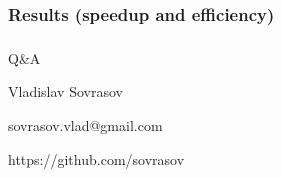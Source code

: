 \documentclass[aspectratio=1610]{beamer}
\begin{document}
\begin{frame}
  \frametitle{Results (speedup and efficiency)}
  \begin{figure}[ht]
      \centering
  \end{figure}
\end{frame}


\begin{frame}{{}}
  \frametitle{ }
  \begin{center}
    \Large{Q\&A}

\vspace{1cm}
    Vladislav Sovrasov

    sovrasov.vlad@gmail.com

    https://github.com/sovrasov
  \end{center}
\end{frame}
\end{document}

